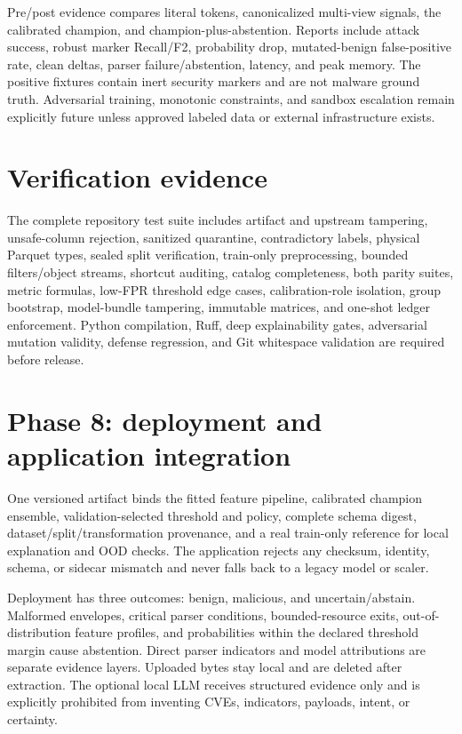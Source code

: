 \documentclass[11pt,a4paper]{article}
\begin{document}
Pre/post evidence compares literal tokens, canonicalized multi-view signals, the
calibrated champion, and champion-plus-abstention. Reports include attack success,
robust marker Recall/F2, probability drop, mutated-benign false-positive rate,
clean deltas, parser failure/abstention, latency, and peak memory. The positive
fixtures contain inert security markers and are not malware ground truth.
Adversarial training, monotonic constraints, and sandbox escalation remain
explicitly future unless approved labeled data or external infrastructure exists.

\section{Verification evidence}

The complete repository test suite includes artifact
and upstream tampering, unsafe-column rejection, sanitized quarantine,
contradictory labels, physical Parquet types, sealed split verification,
train-only preprocessing, bounded filters/object streams, shortcut auditing,
catalog completeness, both parity suites, metric formulas, low-FPR threshold
edge cases, calibration-role isolation, group bootstrap, model-bundle tampering,
immutable matrices, and one-shot ledger enforcement. Python compilation, Ruff,
deep explainability gates, adversarial mutation validity, defense regression,
and Git whitespace validation are required before release.

\section{Phase 8: deployment and application integration}

One versioned artifact binds the fitted feature pipeline, calibrated champion
ensemble, validation-selected threshold and policy, complete schema digest,
dataset/split/transformation provenance, and a real train-only reference for
local explanation and OOD checks. The application rejects any checksum,
identity, schema, or sidecar mismatch and never falls back to a legacy model or
scaler.

Deployment has three outcomes: benign, malicious, and uncertain/abstain.
Malformed envelopes, critical parser conditions, bounded-resource exits,
out-of-distribution feature profiles, and probabilities within the declared
threshold margin cause abstention. Direct parser indicators and model
attributions are separate evidence layers. Uploaded bytes stay local and are
deleted after extraction. The optional local LLM receives structured evidence
only and is explicitly prohibited from inventing CVEs, indicators, payloads,
intent, or certainty.
\end{document}
